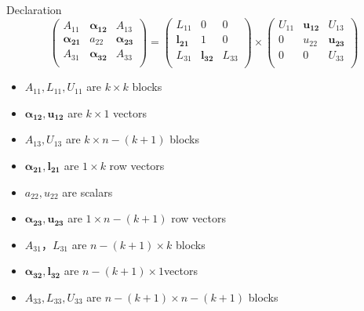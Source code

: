 \documentclass[9pt]{beamer}
\begin{document}
	\begin{frame}{Declaration}
		\[
		\left( \begin{array}{ccc} A_{11} & \pmb{\alpha_{12}}  & A_{13}\\ \pmb{\alpha_{21}} & a_{22}  & \pmb{\alpha_{23}}\\  A_{31} & \pmb{\alpha_{32}}  & A_{33}\\ \end{array} \right)  = \left( \begin{array}{ccc} L_{11} & 0  & 0\\ \pmb{l_{21}} & 1  & 0\\  L_{31} & \pmb{l_{32}}  & L_{33}\\ \end{array} \right) \times \left( \begin{array}{ccc} U_{11} & \pmb{u_{12}}  & U_{13}\\ 0 & u_{22}  & \pmb{u_{23}}\\  0 & 0  & U_{33}\\ \end{array} \right)
		\]
		\begin{itemize}
			\item $A_{11},L_{11},U_{11}$ are $k \times k$ blocks
			\item $\pmb{\alpha_{12}}, \pmb{u_{12}}$ are $k \times 1$ vectors
			\item $A_{13},U_{13}$ are $k\times n-(k+1)$ blocks
			\item $\pmb{\alpha_{21}},\pmb{l_{21}}$ are $1 \times k$ row vectors
			\item $a_{22},u_{22}$ are scalars
			\item $\pmb{\alpha_{23}},\pmb{u_{23}}$ are $1\times n-(k+1)$ row vectors
			\item $A_{31}，L_{31}$ are $n-(k+1) \times k$ blocks
			\item $\pmb{\alpha_{32}},\pmb{l_{32}} $ are $n-(k+1)\times 1$vectors
			\item $A_{33},L_{33},U_{33}$ are $n-(k+1)\times n-(k+1)$ blocks
		\end{itemize}
	\end{frame}
\end{document}

